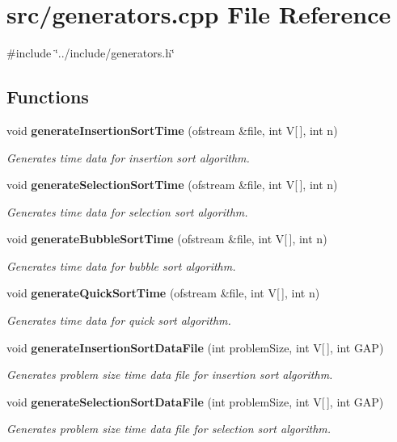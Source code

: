 \section{src/generators.cpp \-File \-Reference}
\label{generators_8cpp}
{\ttfamily \#include \char`\"{}../include/generators.\-h\char`\"{}}\*
\subsection*{\-Functions}
\begin{DoxyCompactItemize}
\item 
void {\bf generate\-Insertion\-Sort\-Time} (ofstream \&file, int \-V[$\,$], int n)
\begin{DoxyCompactList}\small\item\em \-Generates time data for insertion sort algorithm. \end{DoxyCompactList}\item 
void {\bf generate\-Selection\-Sort\-Time} (ofstream \&file, int \-V[$\,$], int n)
\begin{DoxyCompactList}\small\item\em \-Generates time data for selection sort algorithm. \end{DoxyCompactList}\item 
void {\bf generate\-Bubble\-Sort\-Time} (ofstream \&file, int \-V[$\,$], int n)
\begin{DoxyCompactList}\small\item\em \-Generates time data for bubble sort algorithm. \end{DoxyCompactList}\item 
void {\bf generate\-Quick\-Sort\-Time} (ofstream \&file, int \-V[$\,$], int n)
\begin{DoxyCompactList}\small\item\em \-Generates time data for quick sort algorithm. \end{DoxyCompactList}\item 
void {\bf generate\-Insertion\-Sort\-Data\-File} (int problem\-Size, int \-V[$\,$], int \-G\-A\-P)
\begin{DoxyCompactList}\small\item\em \-Generates problem size time data file for insertion sort algorithm. \end{DoxyCompactList}\item 
void {\bf generate\-Selection\-Sort\-Data\-File} (int problem\-Size, int \-V[$\,$], int \-G\-A\-P)
\begin{DoxyCompactList}\small\item\em \-Generates problem size time data file for selection sort algorithm. \end{DoxyCompactList}\item 

\end{DoxyCompactItemize}
